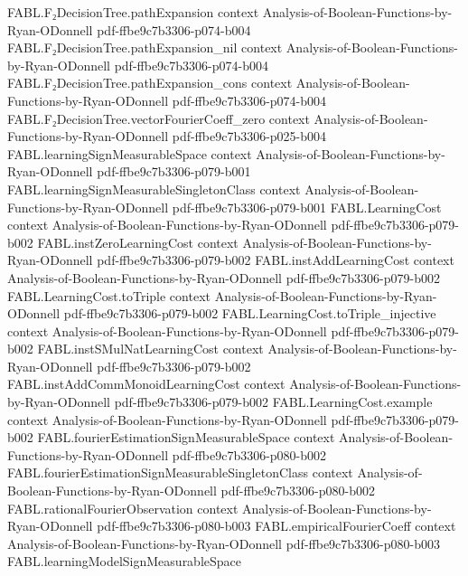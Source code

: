 \begin{theorem}
  {FABL.F₂DecisionTree.pathExpansion}
  {context}
  {Analysis-of-Boolean-Functions-by-Ryan-ODonnell}
  {pdf-ffbe9c7b3306-p074-b004}
\proofstep
  {FABL.F₂DecisionTree.pathExpansion_nil}
  {context}
  {Analysis-of-Boolean-Functions-by-Ryan-ODonnell}
  {pdf-ffbe9c7b3306-p074-b004}
\proofstep
  {FABL.F₂DecisionTree.pathExpansion_cons}
  {context}
  {Analysis-of-Boolean-Functions-by-Ryan-ODonnell}
  {pdf-ffbe9c7b3306-p074-b004}
\proofstep
  {FABL.F₂DecisionTree.vectorFourierCoeff_zero}
  {context}
  {Analysis-of-Boolean-Functions-by-Ryan-ODonnell}
  {pdf-ffbe9c7b3306-p025-b004}
\proofstep
  {FABL.learningSignMeasurableSpace}
  {context}
  {Analysis-of-Boolean-Functions-by-Ryan-ODonnell}
  {pdf-ffbe9c7b3306-p079-b001}
\proofstep
  {FABL.learningSignMeasurableSingletonClass}
  {context}
  {Analysis-of-Boolean-Functions-by-Ryan-ODonnell}
  {pdf-ffbe9c7b3306-p079-b001}
\proofstep
  {FABL.LearningCost}
  {context}
  {Analysis-of-Boolean-Functions-by-Ryan-ODonnell}
  {pdf-ffbe9c7b3306-p079-b002}
\proofstep
  {FABL.instZeroLearningCost}
  {context}
  {Analysis-of-Boolean-Functions-by-Ryan-ODonnell}
  {pdf-ffbe9c7b3306-p079-b002}
\proofstep
  {FABL.instAddLearningCost}
  {context}
  {Analysis-of-Boolean-Functions-by-Ryan-ODonnell}
  {pdf-ffbe9c7b3306-p079-b002}
\proofstep
  {FABL.LearningCost.toTriple}
  {context}
  {Analysis-of-Boolean-Functions-by-Ryan-ODonnell}
  {pdf-ffbe9c7b3306-p079-b002}
\proofstep
  {FABL.LearningCost.toTriple_injective}
  {context}
  {Analysis-of-Boolean-Functions-by-Ryan-ODonnell}
  {pdf-ffbe9c7b3306-p079-b002}
\proofstep
  {FABL.instSMulNatLearningCost}
  {context}
  {Analysis-of-Boolean-Functions-by-Ryan-ODonnell}
  {pdf-ffbe9c7b3306-p079-b002}
\proofstep
  {FABL.instAddCommMonoidLearningCost}
  {context}
  {Analysis-of-Boolean-Functions-by-Ryan-ODonnell}
  {pdf-ffbe9c7b3306-p079-b002}
\proofstep
  {FABL.LearningCost.example}
  {context}
  {Analysis-of-Boolean-Functions-by-Ryan-ODonnell}
  {pdf-ffbe9c7b3306-p079-b002}
\proofstep
  {FABL.fourierEstimationSignMeasurableSpace}
  {context}
  {Analysis-of-Boolean-Functions-by-Ryan-ODonnell}
  {pdf-ffbe9c7b3306-p080-b002}
\proofstep
  {FABL.fourierEstimationSignMeasurableSingletonClass}
  {context}
  {Analysis-of-Boolean-Functions-by-Ryan-ODonnell}
  {pdf-ffbe9c7b3306-p080-b002}
\proofstep
  {FABL.rationalFourierObservation}
  {context}
  {Analysis-of-Boolean-Functions-by-Ryan-ODonnell}
  {pdf-ffbe9c7b3306-p080-b003}
\proofstep
  {FABL.empiricalFourierCoeff}
  {context}
  {Analysis-of-Boolean-Functions-by-Ryan-ODonnell}
  {pdf-ffbe9c7b3306-p080-b003}
\proofstep
  {FABL.learningModelSignMeasurableSpace}

\end{theorem}
